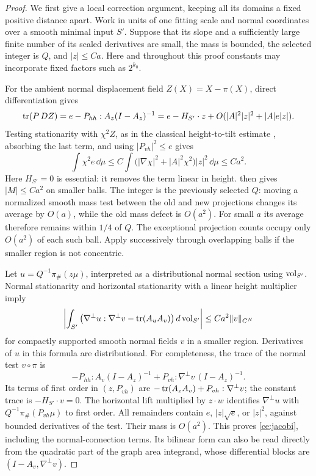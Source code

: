 \begin{proof}
We first give a local correction argument, keeping all its domains a
fixed positive distance apart.  Work in units of one fitting scale and
normal coordinates over a smooth minimal input $S'$.  Suppose that its
slope and a sufficiently large finite number of its scaled derivatives
are small, the mass is bounded, the selected integer is $Q$, and
$|z|\le Ca$.  Here and throughout this proof constants may incorporate
fixed factors such as $2^{k_0}$.

For the ambient normal displacement field $Z(X)=X-\pi(X)$, direct
differentiation gives
\begin{equation}
 \label{ce:normaltrace}
 \operatorname{tr}(P\,DZ)
  =e-P_{hh}:A_z(I-A_z)^{-1}
  =e-H_{S'}\cdot z+O(|A|^2|z|^2+|A|e|z|).
\end{equation}
Testing stationarity with $\chi^2Z$, as in the classical height-to-tilt
estimate \cite[Lemma~31]{Allard1987}, absorbing the last term, and using
$|P_{vh}|^2\le e$ gives
\[
 \int\chi^2e\,\dd\mu
 \le C\int\bigl(|\nabla\chi|^2+|A|^2\chi^2\bigr)|z|^2\,\dd\mu
 \le Ca^2.
\]
Here $H_{S'}=0$ is essential: it removes the term linear in height.
 then gives $|M|\le Ca^2$ on smaller balls.  The integer
is the previously selected $Q$: moving a normalized smooth mass test
between the old and new projections changes its average by $O(a)$,
while the old mass defect is $O(a^2)$. For small $a$ its average
therefore remains within $1/4$ of $Q$. The exceptional projection counts occupy only
$O(a^2)$ of each such ball.  Apply  successively through
overlapping balls if the smaller region is not concentric.

Let $u=Q^{-1}\pi_\#(z\mu)$, interpreted as a distributional normal
section using $\operatorname{vol}_{S'}$.  Normal stationarity and horizontal
stationarity with a linear height multiplier imply
\begin{equation}
 \label{ce:jacobi}
 \left|\int_{S'}\left(
       \nabla^\perp u:\nabla^\perp v-\operatorname{tr}(A_uA_v)\right)
          \mathop{}\!d\operatorname{vol}_{S'}\right|
       \le Ca^2\|v\|_{C^N}
\end{equation}
for compactly supported smooth normal fields $v$ in a smaller region.
Derivatives of $u$ in this formula are distributional.  For completeness,
the trace of the normal test $v\circ\pi$ is
\[
 -P_{hh}:A_v(I-A_z)^{-1}
       +P_{vh}:\nabla^\perp v\,(I-A_z)^{-1}.
\]
Its terms of first order in $(z,P_{vh})$ are
$-\operatorname{tr}(A_zA_v)+P_{vh}:\nabla^\perp v$; the constant trace is
$-H_{S'}\cdot v=0$.  The horizontal lift multiplied by $z\cdot w$
identifies $\nabla^\perp u$ with $Q^{-1}\pi_\#(P_{vh}\mu)$ to first
order.  All remainders contain $e$, $|z|\sqrt e$, or $|z|^2$, against
bounded derivatives of the test.  Their mass is $O(a^2)$.  This proves
\eqref{ce:jacobi}, including the normal-connection terms.  Its bilinear
form can also be read directly from the quadratic part of the graph
area integrand, whose differential blocks are
$(I-A_v,\nabla^\perp v)$.


\end{proof}

